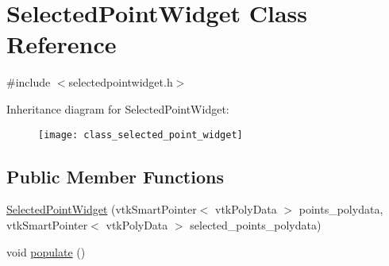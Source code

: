 \hypertarget{class_selected_point_widget}{}\section{Selected\+Point\+Widget Class Reference}
\label{class_selected_point_widget}


{\ttfamily \#include $<$selectedpointwidget.\+h$>$}

Inheritance diagram for Selected\+Point\+Widget\+:\begin{figure}[H]
\begin{center}
\leavevmode
\texttt{[image: class\_selected\_point\_widget]}
\end{center}
\end{figure}
\subsection*{Public Member Functions}
\begin{DoxyCompactItemize}
\item 
\hyperlink{class_selected_point_widget_a6973c27e249b2956b820cc67d8e01353}{Selected\+Point\+Widget} (vtk\+Smart\+Pointer$<$ vtk\+Poly\+Data $>$ points\+\_\+polydata, vtk\+Smart\+Pointer$<$ vtk\+Poly\+Data $>$ selected\+\_\+points\+\_\+polydata)
\item 
void \hyperlink{class_selected_point_widget_afd1322240157289461a8e97b744519c5}{populate} ()
\end{DoxyCompactItemize}
